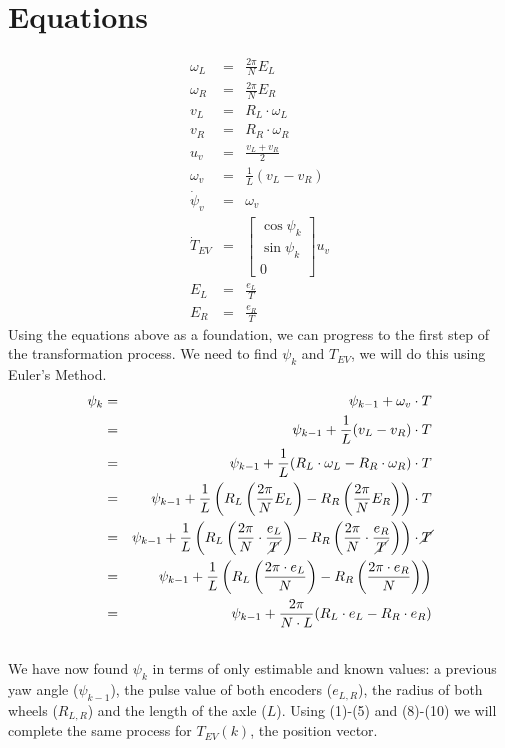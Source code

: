 \documentclass[12pt]{article}
\begin{document}
	\section{Equations}
		\begin{eqnarray}
		\omega_L &=& \frac{2\pi}{N} E_L\\
		\omega_R &=& \frac{2\pi}{N} E_R\\
		v_L &=& R_L\cdot\omega_L\\
		v_R &=& R_R\cdot\omega_R\\
		u_v &=& \frac{v_L + v_R}{2}\\
		\omega_v &=& \frac{1}{L}(v_L - v_R)\\
		\dot{\psi}_v &=& \omega_v\\
		\dot{T}_{EV} &=& 
		\left[
		\begin{array}{c}
		\cos \psi_k\\
		\sin \psi_k \\
		0
		\end{array}
		\right] u_v\\
		E_L &=& \frac{e_L}{T}\\
		E_R &=& \frac{e_R}{T}
	\end{eqnarray}
	Using the equations above as a foundation, we can progress to the first step of the transformation process. We need to find $\psi_k$ and ${T}_{EV}$, we will do this using Euler's Method.
	\begin{eqnarray}
	\psi_k &=& \psi_{k-1} + \omega_v\cdot T \nonumber\\
	&=& \psi_{k-1} + \frac{1}{L}(v_L - v_R)\cdot T \nonumber\\
	&=& \psi_{k-1} + \frac{1}{L}(R_L\cdot\omega_L - R_R\cdot\omega_R)\cdot T \nonumber\\
	&=& \psi_{k-1} + \frac{1}{L}\left(R_L\left(\frac{2\pi}{N} E_L\right) - R_R\left(\frac{2\pi}{N} E_R\right)\right)\cdot T \nonumber\\
	&=& \psi_{k-1} + \frac{1}{L}\left(R_L\left(\frac{2\pi}{N} \cdot \frac{e_L}{\cancel{T}}\right) - R_R\left(\frac{2\pi}{N} \cdot  \frac{e_R}{\cancel{T}}\right)\right)\cdot \cancel{T} \nonumber\\
	&=& \psi_{k-1} + \frac{1}{L}\left(R_L\left(\frac{2\pi \cdot e_L}{N}\right) - R_R \left(\frac{2\pi \cdot e_R}{N}\right)\right) \nonumber \\
	&=& \psi_{k-1} + \frac{2\pi}{N \cdot L}(R_L \cdot e_L - R_R \cdot e_R)\\
	\nonumber \end{eqnarray}
	We have now found $\psi_k$ in terms of only estimable and known values: a previous yaw angle ($\psi_{k-1}$), the pulse value of both encoders ($e_{L,R}$), the radius of both wheels ($R_{L,R}$) and the length of the axle ($L$). Using (1)-(5) and (8)-(10) we will complete the same process for ${T}_{EV}(k)$, the position vector.\\
\end{document}
